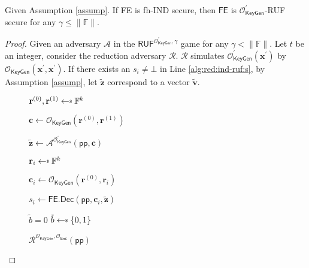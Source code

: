 \begin{theorem}
\label{thm:ind-ruf}
Given Assumption \ref{assump}. If \textsf{FE} is fh-IND secure, then $\textsf{FE}$ is $\mathcal{O}^\prime_{\textsf{KeyGen}}$-RUF secure for any $\gamma \leq \|\mathbb{F}\|$.

\end{theorem}

\begin{proof}
Given an adversary $\mathcal{A}$ in the $\textsf{RUF}^{\mathcal{O}^\prime_{\textsf{KeyGen}}, \gamma}$ game for any $\gamma < \|\mathbb{F}\|$. Let $t$ be an integer, consider the reduction adversary $\mathcal{R}$. $\mathcal{R}$ simulates $\mathcal{O}_\textsf{KeyGen}^\prime(\mathbf{x}^\prime)$ by $\mathcal{O}_\textsf{KeyGen}(\mathbf{x}^\prime, \mathbf{x}^\prime)$.
If there exists an $s_i \neq \bot$ in Line \ref{alg:red:ind-ruf:s}, by Assumption \ref{assump}, let $\mathbf{\tilde{z}}$ correspond to a vector $\mathbf{\tilde{v}}$.

\begin{figure}[h]
\centering
	
	\begin{minipage}[t]{0.5\linewidth}
	\centering
	\begin{algorithm}[H]
	\caption{$\mathcal{R}^{\mathcal{O}_{\textsf{KeyGen}}, \mathcal{O}_{\textsf{Enc}}}(\textsf{pp})$}
	\label{alg:red:ind-ruf}
	\begin{algorithmic}[1]
		\State $\mathbf{r}^{(0)}, \mathbf{r}^{(1)} \getsdollar \mathbb{F}^{k}$
		
		\State $\mathbf{c} \gets \mathcal{O}_{\textsf{KeyGen}}(\mathbf{r}^{(0)}, \mathbf{r}^{(1)})$ 

		\State ${\mathbf{\tilde{z}}} \gets {\mathcal{A}}^{\mathcal{O}^\prime_{\textsf{KeyGen}}} (\textsf{pp}, \mathbf{c})$

		
			\State $\mathbf{r}_i \getsdollar \mathbb{F}^{k}$

			\State $\mathbf{c}_i \gets \mathcal{O}_{\textsf{KeyGen}}(\mathbf{r}^{(0)}, \mathbf{r}_i)$

			\State $s_i \gets \textsf{FE.Dec}( \textsf{pp}, \mathbf{c}_i, \mathbf{\tilde{z}} )$ \label{alg:red:ind-ruf:s}
	
		\EndFor	
		
		 \label{alg:red:ind-ruf:verify}
			\State \Return $\tilde{b} = 0$
		\Else
			\State \Return $\tilde{b} \getsdollar \{0, 1\}$
		\EndIf

	\end{algorithmic}
	\end{algorithm}
	\end{minipage}
	

\end{figure}
\end{proof}
